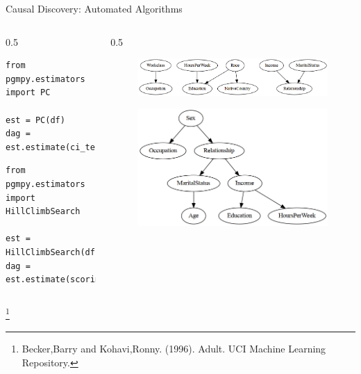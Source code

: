\documentclass[aspectratio=169]{beamer}
\newcommand\blfootnote[1]{
    \begingroup
    \renewcommand\thefootnote{}\footnote{#1}
    \addtocounter{footnote}{-1}
    \endgroup
}
\begin{document}
\begin{frame}[fragile]{Causal Discovery: Automated Algorithms}
	\begin{columns}
		\begin{column}{0.5 \textwidth}
			\begin{verbatim}
from pgmpy.estimators import PC

est = PC(df)
dag = est.estimate(ci_test='chi_square')
			\end{verbatim}
			\vspace{4em}

			\begin{verbatim}
from pgmpy.estimators import HillClimbSearch

est = HillClimbSearch(df)
dag = est.estimate(scoring_method='bicscore')
			\end{verbatim}
		\end{column}
		\begin{column}{0.5 \textwidth}
			\begin{figure}
				\includegraphics[scale=0.25]{imgs/adult_x2.png}
			\end{figure}
			\vspace{2em}
			\begin{figure}
				\includegraphics[scale=0.25]{imgs/adult_bic.png}
			\end{figure}
		\end{column}
	\end{columns}
	\blfootnote{Becker,Barry and Kohavi,Ronny. (1996). Adult. UCI Machine Learning Repository.}
\end{frame}
\end{document}
